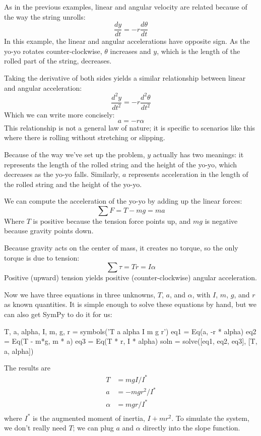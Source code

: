 \documentclass[12pt]{book}
\theoremstyle{exercise}
\begin{document}
As in the previous examples, linear and angular velocity are related because of the way the string unrolls:
%
\[ \frac{dy}{dt} = -r \frac{d \theta}{dt} \]
%
In this example, the linear and angular accelerations have opposite sign.  As the yo-yo rotates counter-clockwise, $\theta$ increases and $y$, which is the length of the rolled part of the string, decreases.

Taking the derivative of both sides yields a similar relationship between linear and angular acceleration:
%
\[ \frac{d^2 y}{dt^2} = -r \frac{d^2 \theta}{dt^2} \]
%
Which we can write more concisely:
%
\[ a = -r \alpha \]
%
This relationship is not a general law of nature; it is specific to scenarios like this where there is rolling without stretching or slipping.


Because of the way we've set up the problem, $y$ actually has two meanings: it represents the length of the rolled string and the height of the yo-yo, which decreases as the yo-yo falls.  Similarly, $a$ represents acceleration in the length of the rolled string and the height of the yo-yo.

We can compute the acceleration of the yo-yo by adding up the linear forces:
%
\[ \sum F = T - mg = ma \]
%
Where $T$ is positive because the tension force points up, and $mg$ is negative because gravity points down.

Because gravity acts on the center of mass, it creates no torque, so the only torque is due to tension:
%
\[ \sum \tau = T r = I \alpha \]
%
Positive (upward) tension yields positive (counter-clockwise) angular acceleration.


Now we have three equations in three unknowns, $T$, $a$, and $\alpha$, with $I$, $m$, $g$, and $r$ as known quantities.  It is simple enough to solve these equations by hand, but we can also get SymPy to do it for us:

\begin{python}
T, a, alpha, I, m, g, r = symbols('T a alpha I m g r')
eq1 = Eq(a, -r * alpha)
eq2 = Eq(T - m*g, m * a)
eq3 = Eq(T * r, I * alpha)
soln = solve([eq1, eq2, eq3], [T, a, alpha])
\end{python}

The results are
%
\begin{align*}
T      &= m g I / I^*   \\
a      &= -m g r^2 / I^* \\
\alpha &= m g r / I^*    \\
\end{align*}
%
where $I^*$ is the augmented moment of inertia, $I + m r^2$.
To simulate the system, we don't really need $T$; we can plug $a$ and $\alpha$ directly into the slope function.
\end{document}

